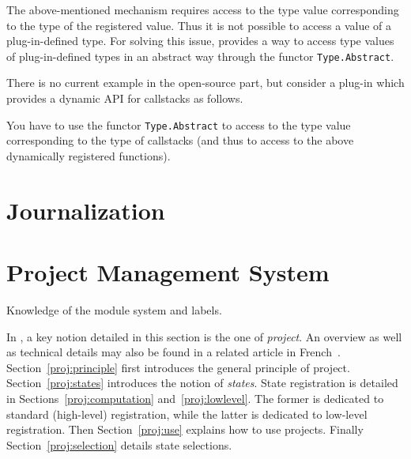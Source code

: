 The above-mentioned mechanism requires access to the type
value corresponding to the type of the registered value. Thus
it is not possible to access a value of a plug-in-defined type. For solving
this issue, \framac provides a way to access type values of
plug-in-defined types in an abstract way through the functor
\texttt{Type.Abstract}.

\begin{example}
There is no current example in the \framac open-source part, but consider a
plug-in which provides a dynamic API for callstacks as follows.

You have to use the functor \texttt{Type.Abstract} to access to the type value
corresponding to the type of callstacks (and thus to access to the above
dynamically registered functions).
\end{example}

\section{Journalization}\label{adv:journalization}

\todo


\section{Project Management System}\label{adv:project}

\begin{prereq}
  Knowledge of the \caml module system and labels.
\end{prereq}

In \framac, a key notion detailed in this section is the one of
\emph{project}. An overview as well as technical details may also be found in a
related article in French~\cite{project}. Section~\ref{proj:principle} first
introduces the general principle of project. Section~\ref{proj:states}
introduces the notion of \emph{states}. State registration is detailed in
Sections~\ref{proj:computation} and~\ref{proj:lowlevel}. The former is dedicated
to standard (high-level) registration, while the latter is dedicated to
low-level registration. Then Section~\ref{proj:use} explains how to use
projects. Finally Section~\ref{proj:selection} details state selections.

